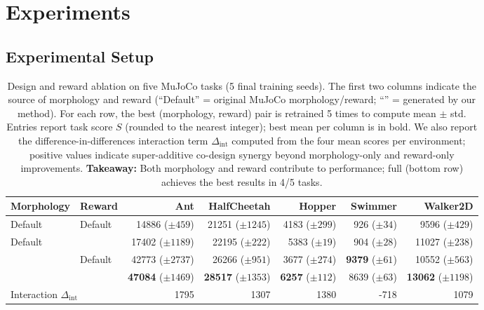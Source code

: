 \section{Experiments}
\label{sec:experiments}

\subsection{Experimental Setup}
\label{sec:experimental_setup}

\begin{table}[t]
    \centering
    \caption{Design and reward ablation on five MuJoCo tasks (5 final training seeds). The first two columns indicate the source of morphology and reward (``Default'' = original MuJoCo morphology/reward; ``\abbrev{}'' = generated by our method). For each row, the best (morphology, reward) pair is retrained 5 times to compute mean $\pm$ std. Entries report task score $S$ (rounded to the nearest integer); best mean per column is in bold. We also report the difference-in-differences interaction term $\Delta_{\text{int}}$ computed from the four mean scores per environment; positive values indicate super-additive co-design synergy beyond morphology-only and reward-only improvements. \textbf{Takeaway:} Both morphology and reward contribute to performance; full \abbrev{} (bottom row) achieves the best results in 4/5 tasks.}
    \label{tab:design_reward_ablation}
    \setlength{\tabcolsep}{4pt}
    \small
    \begin{tabular}{llrrrrr}
        \toprule
        Morphology & Reward & Ant & HalfCheetah & Hopper & Swimmer & Walker2D \\
        \midrule
        Default & Default & 14886 (\(\pm 459\)) & 21251 (\(\pm 1245\)) & 4183 (\(\pm 299\)) & 926 (\(\pm 34\)) & 9596 (\(\pm 429\)) \\
        Default & \abbrev{} & 17402 (\(\pm 1189\)) & 22195 (\(\pm 222\)) & 5383 (\(\pm 19\)) & 904 (\(\pm 28\)) & 11027 (\(\pm 238\)) \\
        \abbrev{} & Default & 42773 (\(\pm 2737\)) & 26266 (\(\pm 951\)) & 3677 (\(\pm 274\)) & \textbf{9379} (\(\pm 61\)) & 10552 (\(\pm 563\)) \\
        \rowcolor{gray!15} \abbrev{} & \abbrev{} & \textbf{47084} (\(\pm 1469\)) & \textbf{28517} (\(\pm 1353\)) & \textbf{6257} (\(\pm 112\)) & 8639 (\(\pm 63\)) & \textbf{13062} (\(\pm 1198\)) \\
        \midrule
        \multicolumn{2}{l}{Interaction $\Delta_{\text{int}}$} & 1795 & 1307 & 1380 & -718 & 1079 \\
        \bottomrule
    \end{tabular}
\end{table}


